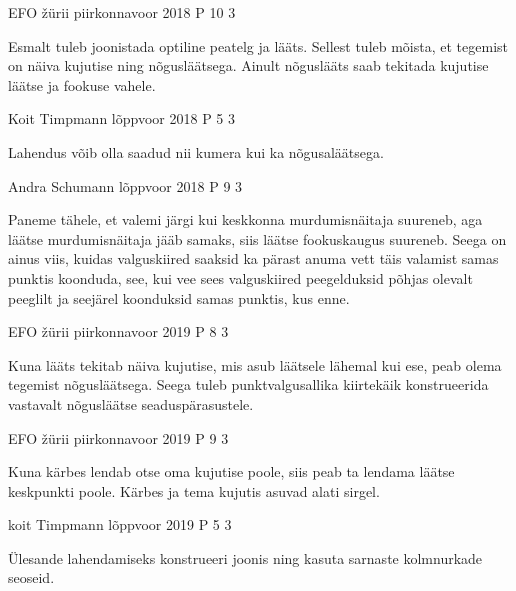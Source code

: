 \documentclass[11pt]{article}
\begin{document}
{%
{EFO žürii} %
{piirkonnavoor} %
{2018} %
{P 10} %
{3} %
{

\ifHint
Esmalt tuleb joonistada optiline peatelg ja lääts. Sellest tuleb mõista, et tegemist on näiva kujutise ning nõgusläätsega. Ainult nõguslääts saab tekitada kujutise läätse ja fookuse vahele.
\fi
}


{Koit Timpmann} %
{lõppvoor} %
{2018} %
{P 5} %
{3} %
{

\ifHint
Lahendus võib olla saadud nii kumera kui ka nõgusaläätsega.
\fi
}

{Andra Schumann} %
{lõppvoor} %
{2018} %
{P 9} %
{3} %
{

\ifHint
Paneme tähele, et valemi järgi kui keskkonna murdumisnäitaja suureneb, aga läätse murdumisnäitaja jääb samaks, siis läätse fookuskaugus suureneb. Seega on ainus viis, kuidas valguskiired saaksid ka pärast anuma vett täis valamist samas punktis koonduda, see, kui vee sees valguskiired peegelduksid põhjas olevalt peeglilt ja seejärel koonduksid samas punktis, kus enne.
\fi
}

{EFO žürii} %
{piirkonnavoor} %
{2019} %
{P 8} %
{3} %
{

\ifHint
Kuna lääts tekitab näiva kujutise, mis asub läätsele lähemal kui ese, peab olema tegemist nõgusläätsega. Seega tuleb punktvalgusallika kiirtekäik konstrueerida vastavalt nõgusläätse seaduspärasustele.
\fi
}


{EFO žürii} %
{piirkonnavoor} %
{2019} %
{P 9} %
{3} %
{

\ifHint
Kuna kärbes lendab otse oma kujutise poole, siis peab ta lendama läätse keskpunkti poole. Kärbes ja tema kujutis asuvad alati sirgel.
\fi
}


{koit Timpmann} %
{lõppvoor} %
{2019} %
{P 5} %
{3} %
{

\ifHint
Ülesande lahendamiseks konstrueeri joonis ning kasuta sarnaste kolmnurkade seoseid.
\fi
}

}
\end{document}
